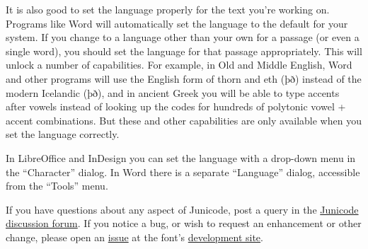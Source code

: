It is also good to set the language properly for the text you're working on.
Programs like Word will automatically set the language to the default for your system. If you
change to a language other than your own for a passage (or even a single word),
you should set the language for that passage appropriately. This will unlock
a number of capabilities. For example, in Old and Middle English, Word and
other programs will use the English form of thorn and eth ({\eng þð}) instead of
the modern Icelandic ({\icel þð}), and in ancient
Greek you will be able to type accents after vowels instead of looking up
the codes for hundreds of polytonic vowel + accent combinations. But these and other capabilities
are only available when you set the language correctly.

In LibreOffice and InDesign you can set the language with a drop-down menu
in the “Character” dialog. In Word there is a separate “Language” dialog,
accessible from the “Tools” menu.

If you have questions about any aspect of Junicode,
post a query in the \href{https://github.com/psb1558/Junicode-font/discussions}%
{Junicode discussion forum}. If you notice a bug, or wish to
request an enhancement or other change, please open an
\href{https://github.com/psb1558/Junicode-font/issues}{issue} at the font's
\href{https://github.com/psb1558/Junicode-font}{development site}.
